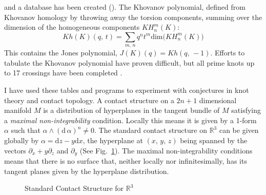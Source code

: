 \documentclass{article}
\theoremstyle{plain}
\begin{document}
        and a database has been created (\cite{HOMFLYData}). The Khovanov
        polynomial, defined from Khovanov homology by throwing away the torsion
        components, summing over the dimension of the homogeneous components
        $KH_{n}^{m}(K)$:
        \begin{equation}
            Kh(K)(q,\,t)=\sum_{m,\,n}
                q^{n}t^{m}\textrm{dim}\big(KH_{n}^{m}(K)\big)
        \end{equation}
        This contains the Jones polynomial, $J(K)(q)=Kh(q,\,-1)$. Efforts to
        tabulate the Khovanov polynomial have proven difficult, but all prime
        knots up to 17 crossings have been completed
        \cite{KhovanovData}.
        \par\hfill\par
        I have used these tables and programs to experiment with conjectures in
        knot theory and contact topology. A contact structure on a
        $2n+1$ dimensional manifold $M$ is a distribution of hyperplanes in the
        tangent bundle of $M$ satisfying a \textit{maximal non-integrability}
        condition. Locally this means it is given by a 1-form $\alpha$ such
        that $\alpha\land(\textrm{d}\,\alpha)^{n}\ne{0}$. The standard contact
        structure on $\mathbb{R}^{3}$ can be given globally by
        $\alpha=\textrm{d}z-y\textrm{d}x$, the hyperplane at $(x,\,y,\,z)$
        being spanned by the vectors $\partial_{x}+y\partial_{z}$ and
        $\partial_{y}$ (See Fig.~\ref{fig:darboux_form}). The maximal
        non-integrability conditions means that there is no surface that,
        neither locally nor infinitesimally, has its tangent planes given by
        the hyperplane distribution.
        \begin{figure}
            \centering
            \caption{Standard Contact Structure for $\mathbb{R}^{3}$}
            \label{fig:darboux_form}
        \end{figure}
\end{document}
